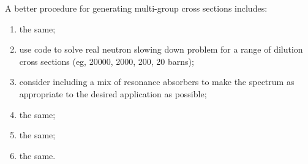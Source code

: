 \documentclass{school-22.211-notes}
\begin{document}
A better procedure for generating multi-group cross sections includes:
\begin{enumerate}
\item the same;
\item use code to solve real neutron slowing down problem for a range of dilution cross sections (eg, 20000, 2000, 200, 20 barns);
\item consider including a mix of resonance absorbers to make the spectrum as appropriate to the desired application as possible;
\item the same;
\item the same;
\item the same.
\end{enumerate}



\end{document}
